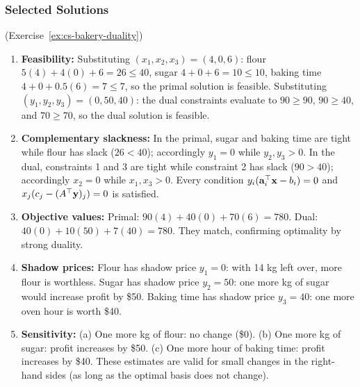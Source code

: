 \subsubsection*{Selected Solutions}

\begin{solution}(Exercise~\ref{ex:cs-bakery-duality})
\begin{enumerate}
\item \textbf{Feasibility:} Substituting $(x_1, x_2, x_3) = (4, 0, 6)$: flour $5(4) + 4(0) + 6 = 26 \leq 40$, sugar $4 + 0 + 6 = 10 \leq 10$, baking time $4 + 0 + 0.5(6) = 7 \leq 7$, so the primal solution is feasible.  Substituting $(y_1, y_2, y_3) = (0, 50, 40)$: the dual constraints evaluate to $90 \geq 90$, $90 \geq 40$, and $70 \geq 70$, so the dual solution is feasible.

\item \textbf{Complementary slackness:} In the primal, sugar and baking time are tight while flour has slack ($26 < 40$); accordingly $y_1 = 0$ while $y_2, y_3 > 0$.  In the dual, constraints 1 and 3 are tight while constraint 2 has slack ($90 > 40$); accordingly $x_2 = 0$ while $x_1, x_3 > 0$.  Every condition $y_i(\mathbf{a}_i^\top \mathbf{x} - b_i) = 0$ and $x_j(c_j - (A^\top \mathbf{y})_j) = 0$ is satisfied.

\item \textbf{Objective values:} Primal: $90(4) + 40(0) + 70(6) = 780$.  Dual: $40(0) + 10(50) + 7(40) = 780$.  They match, confirming optimality by strong duality.

\item \textbf{Shadow prices:} Flour has shadow price $y_1 = 0$: with 14 kg left over, more flour is worthless.  Sugar has shadow price $y_2 = 50$: one more kg of sugar would increase profit by \$50.  Baking time has shadow price $y_3 = 40$: one more oven hour is worth \$40.

\item \textbf{Sensitivity:} (a) One more kg of flour: no change (\$0).  (b) One more kg of sugar: profit increases by \$50.  (c) One more hour of baking time: profit increases by \$40.  These estimates are valid for small changes in the right-hand sides (as long as the optimal basis does not change).
\end{enumerate}
\end{solution}

